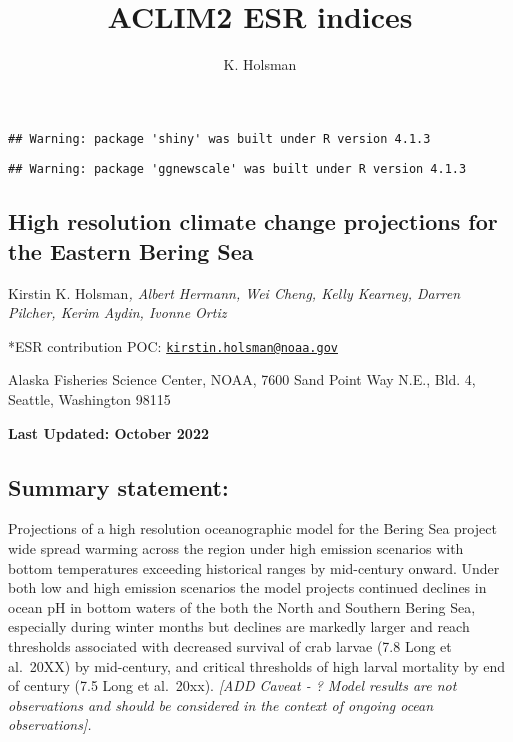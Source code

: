 \documentclass[
]{article}
\title{ACLIM2 ESR indices}
\author{K. Holsman}
\date{}
\begin{document}
\maketitle

{
\setcounter{tocdepth}{3}
\tableofcontents
}
\begin{verbatim}
## Warning: package 'shiny' was built under R version 4.1.3
\end{verbatim}

\begin{verbatim}
## Warning: package 'ggnewscale' was built under R version 4.1.3
\end{verbatim}

\hypertarget{high-resolution-climate-change-projections-for-the-eastern-bering-sea}{%
\subsection{High resolution climate change projections for the Eastern
Bering
Sea}\label{high-resolution-climate-change-projections-for-the-eastern-bering-sea}}

Kirstin K. Holsman\emph{, Albert Hermann, Wei Cheng, Kelly Kearney,
Darren Pilcher, Kerim Aydin, Ivonne Ortiz}

*ESR contribution POC:
\href{mailto:kirstin.holsman@noaa.gov}{\nolinkurl{kirstin.holsman@noaa.gov}}

Alaska Fisheries Science Center, NOAA, 7600 Sand Point Way N.E., Bld. 4,
Seattle, Washington 98115

\textbf{Last Updated: October 2022}

\hypertarget{summary-statement}{%
\subsection{Summary statement:}\label{summary-statement}}

Projections of a high resolution oceanographic model for the Bering Sea
project wide spread warming across the region under high emission
scenarios with bottom temperatures exceeding historical ranges by
mid-century onward. Under both low and high emission scenarios the model
projects continued declines in ocean pH in bottom waters of the both the
North and Southern Bering Sea, especially during winter months but
declines are markedly larger and reach thresholds associated with
decreased survival of crab larvae (7.8 Long et al.~20XX) by mid-century,
and critical thresholds of high larval mortality by end of century (7.5
Long et al.~20xx). \emph{{[}ADD Caveat - ? Model results are not
observations and should be considered in the context of ongoing ocean
observations{]}.}
\end{document}
